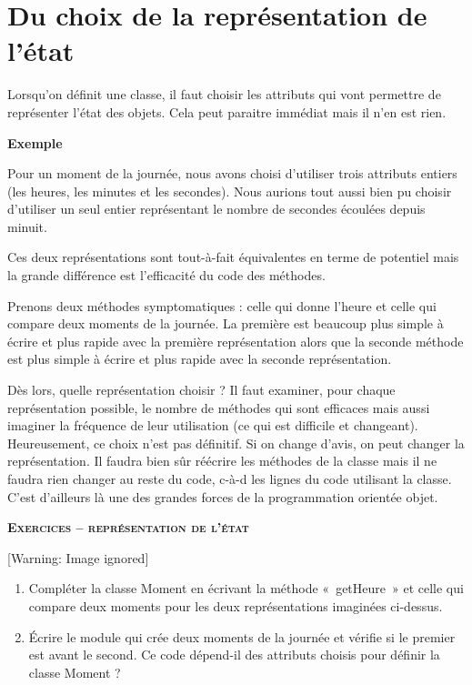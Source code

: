 \bigskip

\section{Du choix de la représentation de l'état}
{
Lorsqu'on définit une classe, il faut choisir les
attributs qui vont permettre de représenter l'état des
objets. Cela peut paraitre immédiat mais il n'en est
rien.}

{\bfseries
Exemple}

{
Pour un moment de la journée, nous avons choisi
d'utiliser trois attributs entiers (les heures, les
minutes et les secondes). Nous aurions tout aussi bien pu choisir
d'utiliser un seul entier représentant le nombre de
secondes écoulées depuis minuit.}

{
Ces deux représentations sont tout-à-fait équivalentes en terme de
potentiel mais la grande différence est l'efficacité
du code des méthodes. }

{
Prenons deux méthodes symptomatiques : celle qui donne
l'heure et celle qui compare deux moments de la
journée. La première est beaucoup plus simple à écrire et plus rapide
avec la première représentation alors que la seconde méthode est plus
simple à écrire et plus rapide avec la seconde représentation.}

{
Dès lors, quelle représentation choisir ? Il faut examiner, pour chaque
représentation possible, le nombre de méthodes qui sont efficaces mais
aussi imaginer la fréquence de leur utilisation (ce qui est difficile
et changeant). Heureusement, ce choix n'est pas
définitif. Si on change d'avis, on peut changer la
représentation. Il faudra bien sûr réécrire les méthodes de la classe
mais il ne faudra rien changer au reste du code, c-à-d les lignes du
code utilisant la classe. C’est d’ailleurs là une des grandes forces de
la programmation orientée objet.}

{\sffamily\bfseries\scshape
Exercices – représentation de l'état}

\begin{center}
 [Warning: Image ignored] %

\end{center}
\liststyleWWviiiNumi
\begin{enumerate}
\item {
Compléter la classe Moment en écrivant la méthode «~getHeure~» et celle
qui compare deux moments pour les deux représentations imaginées
ci-dessus.}
\item {
Écrire le module qui crée deux moments de la journée et vérifie si le
premier est avant le second. Ce code dépend-il des attributs choisis
pour définir la classe Moment ?}
\end{enumerate}

